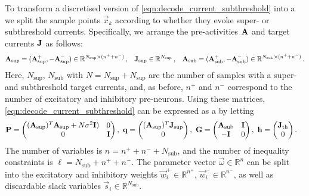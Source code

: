 To transform a discretised version of \cref{eqn:decode_current_subthreshold} into a \qprog we split the sample points $\vec x_k$ according to whether they evoke super- or subthreshold currents.
Specifically, we arrange the pre-activities $\mathbf{A}$ and target currents $\mathbf{J}$ as follows:
\begin{align*}
	\mathbf{A}_\mathrm{sup} = (
		  \mathbf{A}^+_\mathrm{sup}, 
		- \mathbf{A}^-_\mathrm{sup})
		\in
		\mathbb{R}^{N_\mathrm{sup} \times (n^+ + n^-)} \,,
	&&
	\mathbf{J}_\mathrm{sup} \in \mathbb{R}^{N_\mathrm{sup}} \,,
	&&
	\mathbf{A}_\mathrm{sub} = (
		  \mathbf{A}^+_\mathrm{sub}, 
		- \mathbf{A}^-_\mathrm{sub})
		\in
		\mathbb{R}^{N_\mathrm{sub} \times (n^+ + n^-)} \,.
\end{align*}
Here, $N_\mathrm{sup}$, $N_\mathrm{sub}$ with $N = N_\mathrm{sup} + N_\mathrm{sup}$
are the number of samples with a super- and subthreshold target currents, and, as before, $n^+$ and $n^-$ correspond to the number of excitatory and inhibitory pre-neurons.
Using these matrices, \cref{eqn:decode_current_subthreshold} can be expressed as a \QP by letting
\begingroup
\setlength\fboxsep{2pt}
\newcommand{\cA}{LightSkyBlue}
\newcommand{\cB}{Plum}
\newcommand{\cC}{Salmon}
\newcommand{\cD}{Khaki}
\newcommand{\hlA}[1]{{\ensuremath{#1}}}
\newcommand{\hlB}[1]{{\ensuremath{#1}}}
\newcommand{\hlC}[1]{{\ensuremath{#1}}}
\newcommand{\hlD}[1]{{\ensuremath{#1}}}
\begin{align}
	\mat P &= \begin{pmatrix}
		  \hlA{(\mat A_\mathrm{sup})^T \mat A_\mathrm{sup} + N \sigma^2 \mat I)}
		& 0 \\
		  0
		& \hlB{\mat I}
	\end{pmatrix} ,
	&
	\!\!\! \vec q &= \begin{pmatrix}
		\hlA{(\mat A_\mathrm{sup})^T \vec J_\mathrm{sup}} \\
	0
	\end{pmatrix} ,
	&
	\!\!\! \mat G &= \begin{pmatrix}
		\hlC{\mat A_\mathrm{sub}} & \hlB{\mat I} \\
		\hlD{-\mat I} & 0
	\end{pmatrix} ,
	&
	\!\!\! \vec h &= \begin{pmatrix}
		\hlC{\vec{J}_\mathrm{th}} \\
		\hlD{0}
	\end{pmatrix} .
	\label{eqn:decode_subthreshold_qp}
\end{align}
The number of variables is $n = n^+ + n^- + N_\mathrm{sub}$, and the number of inequality constraints is $\ell = N_\mathrm{sub} + n^+ + n^-$.
The parameter vector $\vec \omega \in \mathbb{R}^{n}$ can be split into the excitatory and inhibitory weights $\vec w_i^+ \in \mathbb{R}^{n^+}$, $\vec w_i^- \in \mathbb{R}^{n^-}$, as well as discardable slack variables $\vec s_i \in \mathbb{R}^{N_\mathrm{sub}}$.

